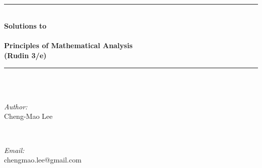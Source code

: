 \begin{titlepage}
$\mathbb{}$

\newcommand{\HRule}{\rule{\linewidth}{0.5mm}} %

\center %




~\\[3cm]
\HRule \\[0.4cm]
{ \huge \bfseries Solutions to \\
~\\
Principles of Mathematical Analysis\\
(Rudin 3/e) }\\[0.4cm] %
\HRule \\[1.2cm]


~\\[2cm]
\begin{minipage}{0.4\textwidth}
\begin{flushleft} \large
\emph{Author:}\\
Cheng-Mao Lee
\end{flushleft}
\end{minipage}
~
\begin{minipage}{0.4\textwidth}
\begin{flushleft} \large
\emph{Email:} \\
chengmao.lee@gmail.com
\end{flushleft}
\end{minipage}\\[6cm]




\end{titlepage}
